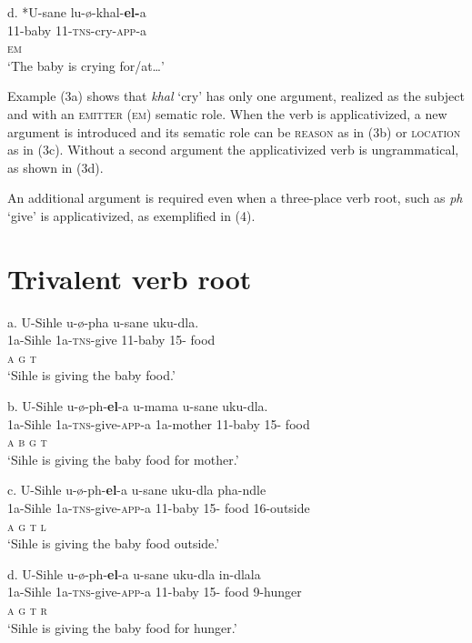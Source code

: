 \documentclass[output=paper]{langsci/langscibook}
\begin{document}
\gll   d.   *U-sane     lu-ø-khal-\textbf{el-}a     \\
         11-baby       11-\textsc{tns}{}-cry-\textsc{app}{}-a   \\
         \textsc{em}  \\
\glt     ‘The baby is crying for/at…’
\z

Example (3a) shows that \textit{khal} ‘cry’ has only one argument, realized as the subject and with an \textsc{emitter} (\textsc{em}) sematic role. When the verb is applicativized, a new argument is introduced and its sematic role can be \textsc{reason} as in (3b) or \textsc{location} as in (3c). Without a second argument the applicativized verb is ungrammatical, as shown in (3d).

  An additional argument is required even when a three-place verb root, such as \textit{ph} ‘give’ is applicativized, as exemplified in (4). 

\chapter{Trivalent verb root}
\gll   a.    U-Sihle   u-ø-pha      u-sane     uku-dla.    \\
         1a-Sihle   1a-\textsc{tns}{}-give   11-baby     15- food \\
         \textsc{a              g      t}\\
\glt     ‘Sihle is giving the baby food.’
\z

\gll   b.    U-Sihle   u-ø-ph-\textbf{el}{}-a          u-mama   u-sane     uku-dla. \\
         1a-Sihle   1a-\textsc{tns}{}-give-\textsc{app}{}-a   1a-mother  11-baby     15- food \\
         \textsc{a                    b         g      t  }\\
\glt     ‘Sihle is giving the baby food for mother.’
\z

\gll   c.    U-Sihle   u-ø-ph-\textbf{el}{}-a        u-sane    uku-dla   pha-ndle    \\
         1a-Sihle   1a-\textsc{tns}{}-give-\textsc{app}{}-a   11-baby     15- food   16-outside\\
         \textsc{a                  g      t           l}\\
\glt     ‘Sihle is giving the baby food outside.’
\z

\gll   d.    U-Sihle   u-ø-ph-\textbf{el}{}-a        u-sane    uku-dla   in-dlala    \\
         1a-Sihle   1a-\textsc{tns}{}-give-\textsc{app}{}-a   11-baby     15- food   9-hunger\\
         \textsc{a                  g      t      r    }\\
\glt     ‘Sihle is giving the baby food for hunger.’
\z
\end{document}
